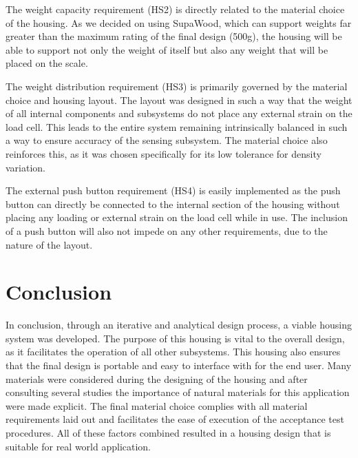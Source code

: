 \documentclass[class=report,11pt,crop=false]{standalone}
\begin{document}
The weight capacity requirement (HS2) is directly related to the material choice of the housing. As we decided on using SupaWood, which can support weights far greater than the maximum rating of the final design (500g), the housing will be able to support not only the weight of itself but also any weight that will be placed on the scale.

The weight distribution requirement (HS3) is primarily governed by the material choice and housing layout. The layout was designed in such a way that the weight of all internal components and subsystems do not place any external strain on the load cell. This leads to the entire system remaining intrinsically balanced in such a way to ensure accuracy of the sensing subsystem. The material choice also reinforces this, as it was chosen specifically for its low tolerance for density variation.

The external push button requirement (HS4) is easily implemented as the push button can directly be connected to the internal section of the housing without placing any loading or external strain on the load cell while in use. The inclusion of a push button will also not impede on any other requirements, due to the nature of the layout. 

\section{Conclusion}
In conclusion, through an iterative and analytical design process, a viable housing system was developed. The purpose of this housing is vital to the overall design, as it facilitates the operation of all other subsystems. This housing also ensures that the final design is portable and easy to interface with for the end user. Many materials were considered during the designing of the housing and after consulting several studies the importance of natural materials for this application were made explicit. The final material choice complies with all material requirements laid out and facilitates the ease of execution of the acceptance test procedures. All of these factors combined resulted in a housing design that is suitable for real world application. 
	\ifstandalone
	
	\printnoidxglossary[type=\acronymtype,nonumberlist]
	\fi
	
\end{document}
